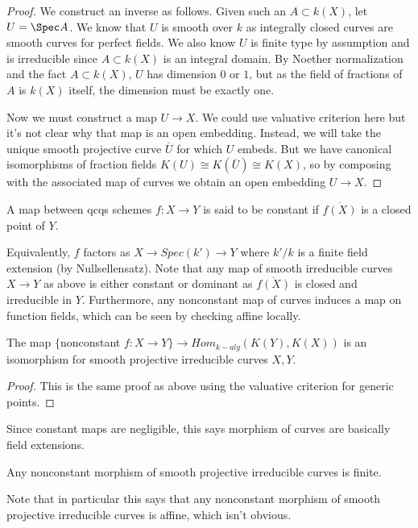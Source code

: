 \begin{proof}
We construct an inverse as follows. Given such an $A \subset k(X)$, let $U = \Spec A$. We know that $U$ is smooth over $k$ as integrally closed curves are smooth curves for perfect fields. We also know $U$ is finite type by assumption and is irreducible since $A \subset k(X)$ is an integral domain. By Noether normalization and the fact $A \subset k(X)$, $U$ has dimension $0$ or $1$, but as the field of fractions of $A$ is $k(X)$ itself, the dimension must be exactly one.

Now we must construct a map $U \to X$. We could use valuative criterion here but it's not clear why that map is an open embedding. Instead, we will take the unique smooth projective curve $\overline{U}$ for which $U$ embeds. But we have canonical isomorphisms of fraction fields $K(U) \cong K(\overline{U}) \cong K(X)$, so by composing with the associated map of curves we obtain an open embedding $U \to X$.
\end{proof}

\begin{defn}
A map between qcqs schemes $f:X \to Y$ is said to be constant if $\overline{f(X)}$ is a closed point of $Y$.
\end{defn}
Equivalently, $f$ factors as $X \to Spec(k') \to Y$ where $k'/k$ is a finite field extension (by Nullsellensatz). Note that any map of smooth irreducible curves $X \to Y$ as above is either constant or dominant as $\overline{f(X)}$ is closed and irreducible in $Y$. Furthermore, any nonconstant map of curves induces a map on function fields, which can be seen by checking affine locally.

\begin{prop}
The map $\{$nonconstant $f:X \to Y\} \to Hom_{k-alg}(K(Y), K(X))$ is an isomorphism for smooth projective irreducible curves $X, Y$. 
\end{prop}
\begin{proof}
This is the same proof as above using the valuative criterion for generic points.
\end{proof}

Since constant maps are negligible, this says morphism of curves are basically field extensions.

\begin{thm}
Any nonconstant morphism of smooth projective irreducible curves is finite.
\end{thm}

Note that in particular this says that any nonconstant morphism of smooth projective irreducible curves is affine, which isn't obvious. 

